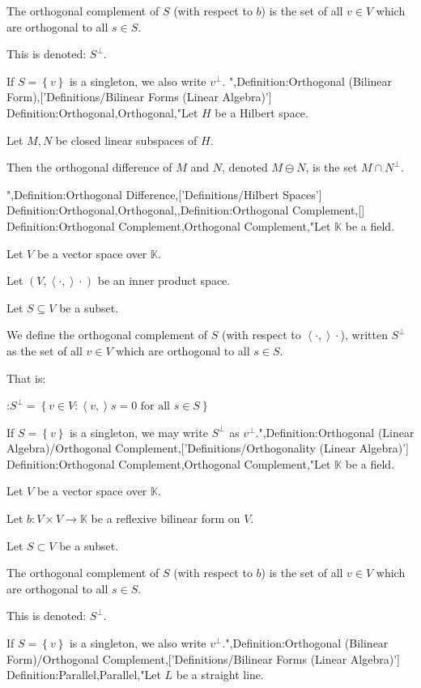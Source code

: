 The orthogonal complement of $S$ (with respect to $b$) is the set of all $v \in V$ which are orthogonal to all $s \in S$.


This is denoted: $S^\perp$.

If $S = \left\lbrace v \right\rbrace$ is a singleton, we also write $v^\perp$.
",Definition:Orthogonal (Bilinear Form),['Definitions/Bilinear Forms (Linear Algebra)']
Definition:Orthogonal,Orthogonal,"Let $H$ be a Hilbert space.

Let $M, N$ be closed linear subspaces of $H$.


Then the orthogonal difference of $M$ and $N$, denoted $M \ominus N$, is the set $M \cap N^\perp$.

",Definition:Orthogonal Difference,['Definitions/Hilbert Spaces']
Definition:Orthogonal,Orthogonal,,Definition:Orthogonal Complement,[]
Definition:Orthogonal Complement,Orthogonal Complement,"Let $\mathbb K$ be a field.

Let $V$ be a vector space over $\mathbb K$.

Let $\left( V, \left\langle \cdot,   \right\rangle\cdot \right)$ be an inner product space.

Let $S\subseteq V$ be a subset.


We define the orthogonal complement of $S$ (with respect to $\left\langle \cdot,   \right\rangle\cdot$), written $S^\perp$ as the set of all $v \in V$ which are orthogonal to all $s \in S$.

That is: 

:$S^\perp = \left\lbrace v \in V : \left\langle v,   \right\rangle s = 0 \text { for all } s \in S \right\rbrace$


If $S = \left\lbrace v \right\rbrace$ is a singleton, we may write $S^\perp$ as $v^\perp$.",Definition:Orthogonal (Linear Algebra)/Orthogonal Complement,['Definitions/Orthogonality (Linear Algebra)']
Definition:Orthogonal Complement,Orthogonal Complement,"Let $\mathbb K$ be a field.

Let $V$ be a vector space over $\mathbb K$.

Let $b : V\times V \to \mathbb K$ be a reflexive bilinear form on $V$.

Let $S\subset V$ be a subset.


The orthogonal complement of $S$ (with respect to $b$) is the set of all $v \in V$ which are orthogonal to all $s \in S$.


This is denoted: $S^\perp$.

If $S = \left\lbrace v \right\rbrace$ is a singleton, we also write $v^\perp$.",Definition:Orthogonal (Bilinear Form)/Orthogonal Complement,['Definitions/Bilinear Forms (Linear Algebra)']
Definition:Parallel,Parallel,"Let $L$ be a straight line.


